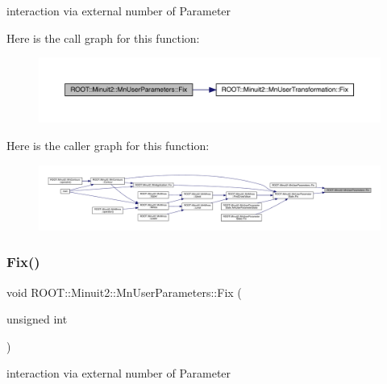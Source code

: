 interaction via external number of Parameter 

Here is the call graph for this function\+:
\nopagebreak
\begin{figure}[H]
\begin{center}
\leavevmode
\includegraphics[width=350pt]{d6/d10/classROOT_1_1Minuit2_1_1MnUserParameters_a53ce277313d9e1f8503e7ffbf8e7bce4_cgraph}
\end{center}
\end{figure}
Here is the caller graph for this function\+:
\nopagebreak
\begin{figure}[H]
\begin{center}
\leavevmode
\includegraphics[width=350pt]{d6/d10/classROOT_1_1Minuit2_1_1MnUserParameters_a53ce277313d9e1f8503e7ffbf8e7bce4_icgraph}
\end{center}
\end{figure}
\mbox{\label{classROOT_1_1Minuit2_1_1MnUserParameters_a53ce277313d9e1f8503e7ffbf8e7bce4}} 
\subsubsection{\texorpdfstring{Fix()}{Fix()}\hspace{0.1cm}{\footnotesize\ttfamily [3/6]}}
{\footnotesize\ttfamily void R\+O\+O\+T\+::\+Minuit2\+::\+Mn\+User\+Parameters\+::\+Fix (\begin{DoxyParamCaption}\item[{unsigned int}]{ }\end{DoxyParamCaption})}



interaction via external number of Parameter 

\mbox{\label{classROOT_1_1Minuit2_1_1MnUserParameters_a2ae09cd0fae9785d4c097439862ab63b}} 
